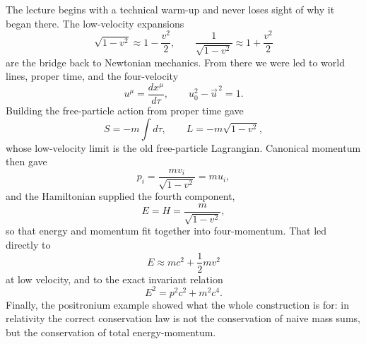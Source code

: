 The lecture begins with a technical warm-up and never loses sight of why it began there. The low-velocity expansions
\begin{equation}
\sqrt{1-v^2}\approx 1-\frac{v^2}{2},
\qquad
\frac{1}{\sqrt{1-v^2}}\approx 1+\frac{v^2}{2}
\end{equation}
are the bridge back to Newtonian mechanics. From there we were led to world lines, proper time, and the four-velocity
\begin{equation}
u^\mu=\frac{dx^\mu}{d\tau},
\qquad
u_0^2-\vec u^{\,2}=1.
\end{equation}
Building the free-particle action from proper time gave
\begin{equation}
S=-m\int d\tau,
\qquad
L=-m\sqrt{1-v^2},
\end{equation}
whose low-velocity limit is the old free-particle Lagrangian. Canonical momentum then gave
\begin{equation}
p_i = \frac{m v_i}{\sqrt{1-v^2}}=m u_i,
\end{equation}
and the Hamiltonian supplied the fourth component,
\begin{equation}
E=H=\frac{m}{\sqrt{1-v^2}},
\end{equation}
so that energy and momentum fit together into four-momentum. That led directly to
\begin{equation}
E\approx mc^2+\frac12 mv^2
\end{equation}
at low velocity, and to the exact invariant relation
\begin{equation}
E^2=p^2c^2+m^2c^4.
\end{equation}
Finally, the positronium example showed what the whole construction is for: in relativity the correct conservation law is not the conservation of naive mass sums, but the conservation of total energy-momentum.